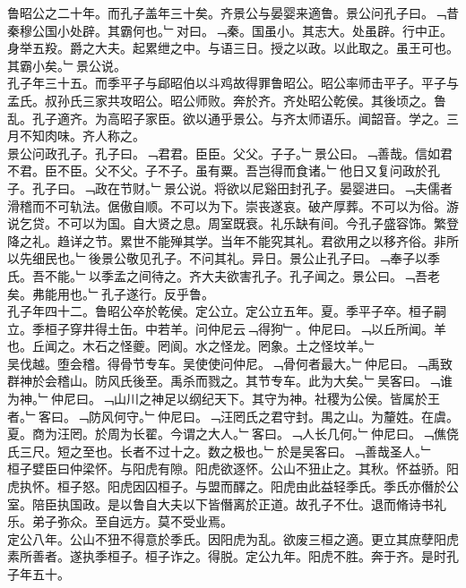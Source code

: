 \documentclass{zhvt-classic}
\begin{document}
\hspace*{2em}鲁昭公之二十年。而孔子盖年三十矣。齐景公与晏婴来適鲁。景公问孔子曰。﹁昔秦穆公国小处辟。其霸何也。﹂对曰。﹁秦。国虽小。其志大。处虽辟。行中正。身举五羖。爵之大夫。起累绁之中。与语三日。授之以政。以此取之。虽王可也。其霸小矣。﹂景公说。\\
\hspace*{2em}孔子年三十五。而季平子与郈昭伯以斗鸡故得罪鲁昭公。昭公率师击平子。平子与孟氏。叔孙氏三家共攻昭公。昭公师败。奔於齐。齐处昭公乾侯。其後顷之。鲁乱。孔子適齐。为高昭子家臣。欲以通乎景公。与齐太师语乐。闻韶音。学之。三月不知肉味。齐人称之。\\
\hspace*{2em}景公问政孔子。孔子曰。﹁君君。臣臣。父父。子子。﹂景公曰。﹁善哉。信如君不君。臣不臣。父不父。子不子。虽有粟。吾岂得而食诸。﹂他日又复问政於孔子。孔子曰。﹁政在节财。﹂景公说。将欲以尼谿田封孔子。晏婴进曰。﹁夫儒者滑稽而不可轨法。倨傲自顺。不可以为下。崇丧遂哀。破产厚葬。不可以为俗。游说乞贷。不可以为国。自大贤之息。周室既衰。礼乐缺有间。今孔子盛容饰。繁登降之礼。趋详之节。累世不能殚其学。当年不能究其礼。君欲用之以移齐俗。非所以先细民也。﹂後景公敬见孔子。不问其礼。异日。景公止孔子曰。﹁奉子以季氏。吾不能。﹂以季孟之间待之。齐大夫欲害孔子。孔子闻之。景公曰。﹁吾老矣。弗能用也。﹂孔子遂行。反乎鲁。\\
\hspace*{2em}孔子年四十二。鲁昭公卒於乾侯。定公立。定公立五年。夏。季平子卒。桓子嗣立。季桓子穿井得土缶。中若羊。问仲尼云﹁得狗﹂。仲尼曰。﹁以丘所闻。羊也。丘闻之。木石之怪夔。罔阆。水之怪龙。罔象。土之怪坟羊。﹂\\
\hspace*{2em}吴伐越。堕会稽。得骨节专车。吴使使问仲尼。﹁骨何者最大。﹂仲尼曰。﹁禹致群神於会稽山。防风氏後至。禹杀而戮之。其节专车。此为大矣。﹂吴客曰。﹁谁为神。﹂仲尼曰。﹁山川之神足以纲纪天下。其守为神。社稷为公侯。皆属於王者。﹂客曰。﹁防风何守。﹂仲尼曰。﹁汪罔氏之君守封。禺之山。为釐姓。在虞。夏。商为汪罔。於周为长翟。今谓之大人。﹂客曰。﹁人长几何。﹂仲尼曰。﹁僬侥氏三尺。短之至也。长者不过十之。数之极也。﹂於是吴客曰。﹁善哉圣人。﹂\\
\hspace*{2em}桓子嬖臣曰仲梁怀。与阳虎有隙。阳虎欲逐怀。公山不狃止之。其秋。怀益骄。阳虎执怀。桓子怒。阳虎因囚桓子。与盟而醳之。阳虎由此益轻季氏。季氏亦僭於公室。陪臣执国政。是以鲁自大夫以下皆僭离於正道。故孔子不仕。退而脩诗书礼乐。弟子弥众。至自远方。莫不受业焉。\\
\hspace*{2em}定公八年。公山不狃不得意於季氏。因阳虎为乱。欲废三桓之適。更立其庶孽阳虎素所善者。遂执季桓子。桓子诈之。得脱。定公九年。阳虎不胜。奔于齐。是时孔子年五十。\\
\end{document}
